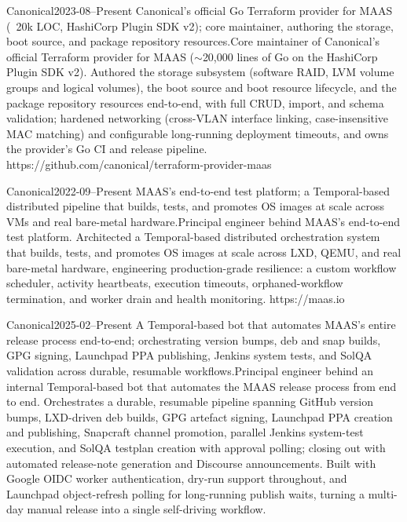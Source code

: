 {Canonical}{2023-08--Present}
{\iflean Canonical's official Go Terraform provider for MAAS (~20k LOC, HashiCorp Plugin SDK v2); core maintainer, authoring the storage, boot source, and package repository resources.\else Core maintainer of Canonical's official Terraform provider for MAAS ($\sim$20,000 lines of Go on the HashiCorp Plugin SDK v2). Authored the storage subsystem (software RAID, LVM volume groups and logical volumes), the boot source and boot resource lifecycle, and the package repository resources end-to-end, with full CRUD, import, and schema validation; hardened networking (cross-VLAN interface linking, case-insensitive MAC matching) and configurable long-running deployment timeouts, and owns the provider's Go CI and release pipeline.\fi}
{https://github.com/canonical/terraform-provider-maas}

{Canonical}{2022-09--Present}
{\iflean MAAS's end-to-end test platform; a Temporal-based distributed pipeline that builds, tests, and promotes OS images at scale across VMs and real bare-metal hardware.\else Principal engineer behind MAAS's end-to-end test platform. Architected a Temporal-based distributed orchestration system that builds, tests, and promotes OS images at scale across LXD, QEMU, and real bare-metal hardware, engineering production-grade resilience: a custom workflow scheduler, activity heartbeats, execution timeouts, orphaned-workflow termination, and worker drain and health monitoring.\fi}
{https://maas.io}

{Canonical}{2025-02--Present}
{\iflean A Temporal-based bot that automates MAAS's entire release process end-to-end; orchestrating version bumps, deb and snap builds, GPG signing, Launchpad PPA publishing, Jenkins system tests, and SolQA validation across durable, resumable workflows.\else Principal engineer behind an internal Temporal-based bot that automates the MAAS release process from end to end. Orchestrates a durable, resumable pipeline spanning GitHub version bumps, LXD-driven deb builds, GPG artefact signing, Launchpad PPA creation and publishing, Snapcraft channel promotion, parallel Jenkins system-test execution, and SolQA testplan creation with approval polling; closing out with automated release-note generation and Discourse announcements. Built with Google OIDC worker authentication, dry-run support throughout, and Launchpad object-refresh polling for long-running publish waits, turning a multi-day manual release into a single self-driving workflow.\fi}
{}

